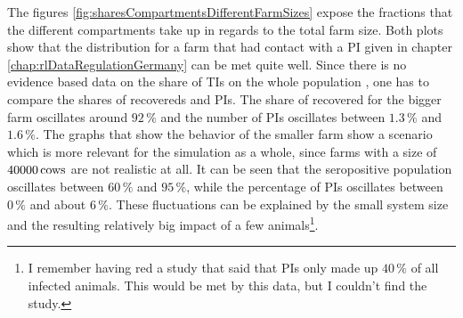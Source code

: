 The figures \ref{fig:sharesCompartmentsDifferentFarmSizes} expose the fractions that the different compartments take up in regards to the total farm size. Both plots show that the distribution for a farm that had contact with a PI given in chapter \ref{chap:rlDataRegulationGermany}  can be met quite well. Since there is no evidence based data on the share of TIs on the whole population \citep{personalCom}, one has to compare the shares of recovereds and PIs. The share of recovered for the bigger farm oscillates around $92\,\%$ and the number of PIs oscillates between $1.3\,\%$ and $1.6\,\%$. The graphs that show the behavior of the smaller farm show a scenario which is more relevant for the simulation as a whole, since farms with a size of $40000\,\text{cows}$ are not realistic at all. It can be seen that the seropositive population oscillates between $60\,\%$ and $95\,\%$, while the percentage of PIs oscillates between $0\,\%$ and about $6\,\%$. These fluctuations can be explained by the small system size and the resulting relatively big impact of a few animals\footnote{I remember having red a study that said that PIs only made up $40\,\%$ of all infected animals. This would be met by this data, but I couldn't find the study.}. 

